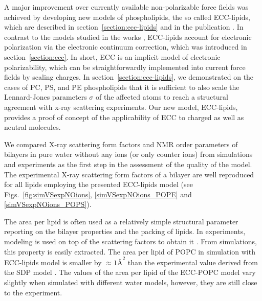 \documentclass[12pt,a4paper,twoside,openright]{report}
\begin{document}

A major improvement over currently available non-polarizable force fields
was achieved by developing new models of phospholipids, 
the so called ECC-lipids,
which are described in section~\ref{section:ecc-lipids}
and in the publication \citep{melcr18}. 
In contrast to the models studied in the works \citep{catte16, nmrlipids_proj4},
ECC-lipids account for electronic polarization
via the electronic continuum correction,  
which was introduced in section~\ref{section:ecc}. 
In short, 
ECC is an implicit model of electronic polarizability,
which can be straightforwardly implemented into current force fields 
by scaling charges.  
In section~\ref{section:ecc-lipids},
we demonstrated on the cases of PC, PS, and PE phospholipids
that it is sufficient to also scale the Lennard-Jones parameters $\sigma$ of the affected atoms
to reach a structural agreement with x-ray scattering experiments. 
Our new model, ECC-lipids,
provides a proof of concept of the applicability of ECC
to charged as well as neutral molecules. 
 
We compared X-ray scattering form factors and NMR order parameters of bilayers
in pure water without any ions (or only counter ions)
from simulations and experiments
as the first step in the assessment of the quality of the model. 
The experimental X-ray scattering form factors 
of a bilayer are well reproduced for all lipids employing the presented ECC-lipids model 
(see Figs.~\ref{fig:simVSexpNOions}, \ref{simVSexpNOions_POPE} and \ref{simVSexpNOions_POPS}). 

The area per lipid is often used as a relatively simple structural parameter reporting on the bilayer properties and the packing of lipids. 
In experiments, modeling is used on top of the scattering factors to obtain it \citep{kucerka14}. 
From simulations, this property is easily extracted. 
The area per lipid of POPC in simulation with ECC-lipids model is smaller by $\approx 1Å^2$ 
than the experimental value derived from the SDP model \citep{kucerka14}. 
The values of the area per lipid of the ECC-POPC model vary slightly 
when simulated with different water models, however,
they are still close to the experiment. \citep{melcr18}
\end{document}
